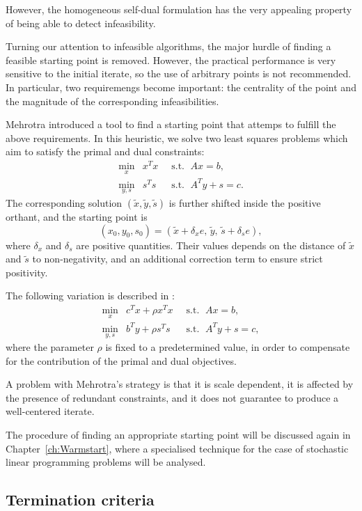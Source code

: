 However, the homogeneous self-dual formulation has the very
appealing property of being able to detect infeasibility.

Turning our attention to infeasible algorithms, the major hurdle
of finding a feasible starting point is removed. 
However, the practical performance is very sensitive to the initial
iterate, so the use of arbitrary points is not recommended.
In particular, two requiremengs become important: the centrality 
of the point and the magnitude of the corresponding infeasibilities.

Mehrotra \cite{Mehrotra92} introduced a tool to find a starting point 
that attemps to fulfill the above requirements. In this
heuristic, we solve two least squares problems which aim to
satisfy the primal and dual constraints:
\begin{eqnarray*}
  \min_x    \!\! & x^Tx & \;\;\mbox{s.t. }\; Ax = b,      \\
  \min_{y,s}\!\! & s^Ts & \;\;\mbox{s.t. }\; A^Ty + s = c.
\end{eqnarray*}
The corresponding solution $(\tilde x, \tilde y, \tilde s)$ is further 
shifted inside the positive orthant, and the starting point is
\[
(x_0,y_0,s_0) = (\tilde x + \delta_x e,\, \tilde y,\, \tilde s + \delta_s e),
\]
where $\delta_x$ and $\delta_s$ are positive quantities. 
Their values depends on the distance of $\tilde x$ and $\tilde s$
to non-negativity, and an additional correction term to ensure
strict positivity.

The following variation is described in \cite{GondzioTerlaky}:
\begin{eqnarray*} 
  \min_x    \!\! & c^Tx + \rho x^Tx & \;\;\mbox{s.t. }\; Ax = b,      \\
  \min_{y,s}\!\! & b^Ty + \rho s^Ts & \;\;\mbox{s.t. }\; A^Ty + s = c,
\end{eqnarray*}
where the parameter $\rho$ is fixed to a predetermined value, in order
to compensate for the contribution of the primal and dual objectives.

A problem with Mehrotra's strategy is that it is scale dependent,
it is affected by the presence of redundant constraints,
and it does not guarantee to produce a well-centered iterate.

The procedure of finding an appropriate starting point will be discussed
again in Chapter~\ref{ch:Warmstart}, where a specialised technique for
the case of stochastic linear programming problems will be analysed.

%
%
\subsection{Termination criteria}

